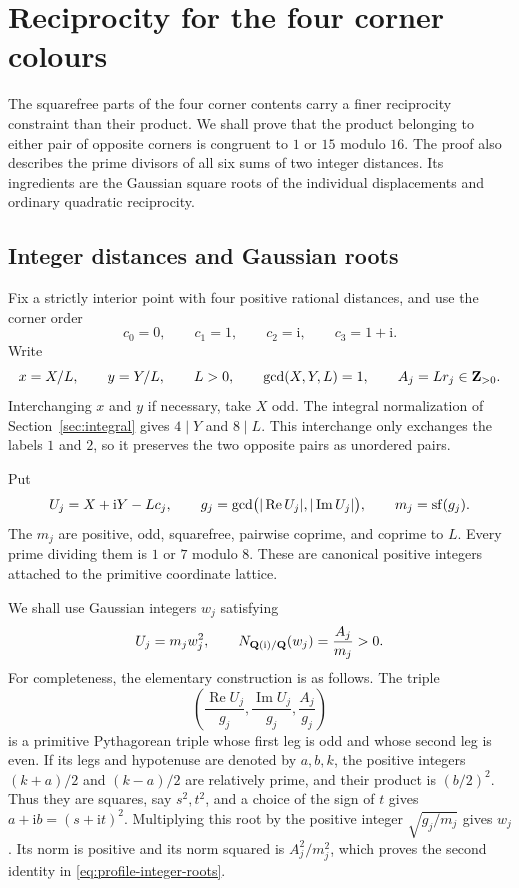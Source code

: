 \section{Reciprocity for the four corner colours}\label{sec:profiles}

The squarefree parts of the four corner contents carry a finer reciprocity
constraint than their product.  We shall prove that the product belonging
to either pair of opposite corners is congruent to $1$ or $15$ modulo
$16$.  The proof also describes the prime divisors of all six sums of two
integer distances.  Its ingredients are the Gaussian square roots of the
individual displacements and ordinary quadratic reciprocity.

\subsection{Integer distances and Gaussian roots}

Fix a strictly interior point with four positive rational distances, and use the corner
order
\[
 c_0=0,\qquad c_1=1,\qquad c_2=\mathrm i,\qquad c_3=1+\mathrm i.
\]
Write
\begin{equation}\label{eq:profile-lattice}
 x=X/L,\qquad y=Y/L,\qquad L>0,\qquad \gcd(X,Y,L)=1,
 \qquad A_j=Lr_j\in\Z_{>0}.
\end{equation}
Interchanging $x$ and $y$ if necessary, take $X$ odd.  The integral
normalization of Section~\ref{sec:integral} gives $4\mid Y$ and
$8\mid L$.  This interchange only exchanges the labels $1$ and $2$,
so it preserves the two opposite pairs as unordered pairs.

Put
\begin{equation}\label{eq:profile-colours}
 U_j=X+\mathrm iY-Lc_j,\qquad
 g_j=\gcd\bigl(|\operatorname{Re}U_j|,|\operatorname{Im}U_j|\bigr),
 \qquad m_j=\sf(g_j).
\end{equation}
The $m_j$ are positive, odd, squarefree, pairwise coprime, and coprime
to $L$.  Every prime dividing them is $1$ or $7$ modulo $8$.
These are canonical positive integers attached to the primitive
coordinate lattice.

We shall use Gaussian integers $w_j$ satisfying
\begin{equation}\label{eq:profile-integer-roots}
 U_j=m_jw_j^2,\qquad
 N_{\Q(\mathrm i)/\Q}(w_j)=\frac{A_j}{m_j}>0.
\end{equation}
For completeness, the elementary construction is as follows.  The
triple
\[
 \left(\frac{\operatorname{Re}U_j}{g_j},
       \frac{\operatorname{Im}U_j}{g_j},\frac{A_j}{g_j}\right)
\]
is a primitive Pythagorean triple whose first leg is odd and whose
second leg is even.  If its legs and hypotenuse are denoted by $a,b,k$,
the positive integers $(k+a)/2$ and $(k-a)/2$ are relatively prime,
and their product is $(b/2)^2$.  Thus they are squares, say $s^2,t^2$,
and a choice of the sign of $t$ gives $a+\mathrm ib=(s+\mathrm it)^2$.
Multiplying this root by the positive integer $\sqrt{g_j/m_j}$ gives
$w_j$.  Its norm is positive and its norm squared is $A_j^2/m_j^2$,
which proves the second identity in \eqref{eq:profile-integer-roots}.

